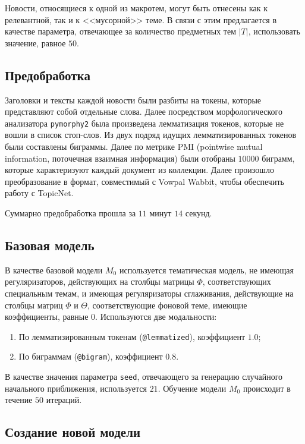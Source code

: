 \documentclass{article}
\begin{document}
Новости, относящиеся к одной из макротем, могут быть отнесены как к релевантной, так и к <<мусорной>> теме. В связи с этим предлагается в качестве параметра, отвечающее за количество предметных тем $|T|$, использовать значение, равное $50$.

\subsection{Предобработка}

Заголовки и тексты каждой новости были разбиты на токены, которые представляют собой отдельные слова.
Далее посредством морфологического анализатора \texttt{pymorphy2} \citep{pymorphy2} была произведена лемматизация токенов, которые не вошли в список стоп-слов.
Из двух подряд идущих лемматизированных токенов были составлены биграммы. Далее по метрике PMI (pointwise mutual information, поточечная взаимная информация) были отобраны $10 000$ биграмм, которые характеризуют каждый документ из коллекции. Далее произошло преобразование в формат, совместимый с Vowpal Wabbit, чтобы обеспечить работу с TopicNet.

Суммарно предобработка прошла за $11$ минут $14$ секунд.

\subsection{Базовая модель}

В качестве базовой модели $M_0$ используется тематическая модель, не имеющая регуляризаторов, действующих на столбцы матрицы $\Phi$, соответствующих специальным темам, и имеющая регуляризаторы сглаживания, действующие на столбцы матриц $\Phi$ и $\Theta$, соответствующие фоновой теме, имеющие коэффициенты, равные $0$.
Используются две модальности:
\begin{enumerate}
    \item По лемматизированным токенам (\texttt{@lemmatized}), коэффициент $1.0$;
    \item По биграммам (\texttt{@bigram}), коэффициент $0.8$.
\end{enumerate}
В качестве значения параметра \texttt{seed}, отвечающего за генерацию случайного начального приближения, используется $21$.
Обучение модели $M_0$ происходит в течение $50$ итераций.

\subsection{Создание новой модели}
\end{document}
